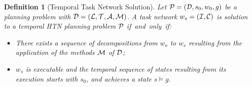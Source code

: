 \documentclass[letterpaper]{article} %
\newtheorem{definition}{Definition}
\newcommand{\name}{\text{\it name}}
\newcommand{\tstart}{\text{\it start}}
\newcommand{\tend}{\text{\it end}}
\newcommand{\task}{\text{\it task}}
\begin{document}
\begin{comment}
\begin{definition}[Decomposition]
Let $m = \bigl(\name(m),$ $\task(m), tn(m)\bigr)$ be a method with a task network $tn(m) = ({\cal{I}}^m, \alpha^m, {\cal{C}}_{o}^{m},{\cal{C}}_{d}^{m}, {\cal{C}}_{t}^{m})$ and a task network to decompose $w_1= ({\cal{I}}^1, \alpha^1, {\cal{C}}_{o}^{1},{\cal{C}}_{d}^{1}, {\cal{C}}_{t}^{1})$. We suppose ${\cal{I}}^m \cap {\cal{I}}^1 = \emptyset$. This can be achieved by renaming. Then, $m$ decomposes a task identifier $i \in {\cal{I}}^1$ into a task network $w_2= ({\cal{I}}^2, \alpha^2, {\cal{C}}_{o}^{2},{\cal{C}}_{d}^{2}, {\cal{C}}_{t}^{2})$ if and only if $\alpha^1(i) = task(m)$ and
\begin{equation*} \label{eq1}
\begin{aligned}
{\cal{I}}^2 = & ({\cal{I}}^1 - \{i\}) \cup {\cal{I}}^m\\
\alpha^2 = & (\alpha^1 \cup \alpha^m)\\
{\cal{C}}^{2}_{o} = & {\cal{C}}^{1}_{o} \cup {\cal{C}}^{m}_{o} \\
        & \cup \{ c \ | \ \forall j \in {\cal{I}}^m \ \tstart(i) \leq \tstart(j) \}  \\
        & \cup \{ c \ | \ \forall j \in {\cal{I}}^m \ \tend(i) \geq \tend(j) \}  \\
{\cal{C}}^{2}_{d}  = & {\cal{C}}^{1}_{d} \cup {\cal{C}}^{m}_{d} \\
{\cal{C}}^{2}_{t}  = & {\cal{C}}^{1}_{t} \cup {\cal{C}}^{m}_{t} \\
\end{aligned}
\end{equation*}
\end{definition}
\end{comment}



\begin{definition}[Temporal Task Network Solution]
  Let ${\cal{P}} = ({\cal{D}}, s_0, w_0, g)$ be a planning problem with $\cal{D} = ({\cal{L}}, {\cal{T}}, {\cal{A}}, {\cal{M}})$. A task network $w_s = ({\cal{I}}, {\cal{C}})$ is solution to a temporal HTN planning problem ${\cal{P}}$ \mbox{if and only if:}
  \begin{itemize}
    \item There exists a sequence of decompositions from $w_o$ to $w_s$ resulting from the application of the methods ${\cal{M}}$ of ${\cal{D}}$;
\item $w_s$ is executable and the temporal sequence of states resulting from its execution starts with $s_0$, and achieves a state $s \models g$.
\end{itemize}
\end{definition}
\end{document}
